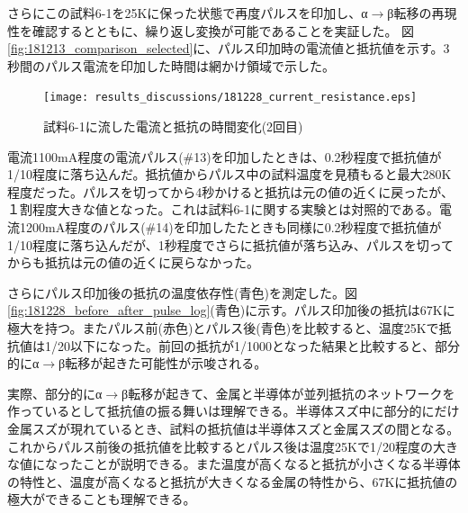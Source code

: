 さらにこの試料6-1を25Kに保った状態で再度パルスを印加し、α$\to$β転移の再現性を確認するとともに、繰り返し変換が可能であることを実証した。
図\ref{fig:181213_comparison_selected}に、パルス印加時の電流値と抵抗値を示す。3秒間のパルス電流を印加した時間は網かけ領域で示した。
\begin{figure}[!h]
    \begin{center}
   \texttt{[image: results\_discussions/181228\_current\_resistance.eps]}
  \end{center}
  \caption{試料6-1に流した電流と抵抗の時間変化(2回目)}
  \label{fig:181228_current_resistance.eps}
\end{figure}

電流1100mA程度の電流パルス(\#13)を印加したときは、0.2秒程度で抵抗値が1/10程度に落ち込んだ。抵抗値からパルス中の試料温度を見積もると最大280K程度だった。パルスを切ってから4秒かけると抵抗は元の値の近くに戻ったが、１割程度大きな値となった。これは試料6-1に関する実験とは対照的である。電流1200mA程度のパルス(\#14)を印加したたときも同様に0.2秒程度で抵抗値が1/10程度に落ち込んだが、1秒程度でさらに抵抗値が落ち込み、パルスを切ってからも抵抗は元の値の近くに戻らなかった。%

さらにパルス印加後の抵抗の温度依存性(青色)を測定した。図\ref{fig:181228_before_after_pulse_log}(青色)に示す。パルス印加後の抵抗は67Kに極大を持つ。またパルス前(赤色)とパルス後(青色)を比較すると、温度25Kで抵抗値は1/20以下になった。前回の抵抗が1/1000となった結果と比較すると、部分的にα$\to$β転移が起きた可能性が示唆される。

実際、部分的にα$\to$β転移が起きて、金属と半導体が並列抵抗のネットワークを作っているとして抵抗値の振る舞いは理解できる。半導体スズ中に部分的にだけ金属スズが現れているとき、試料の抵抗値は半導体スズと金属スズの間となる。これからパルス前後の抵抗値を比較するとパルス後は温度25Kで1/20程度の大きな値になったことが説明できる。また温度が高くなると抵抗が小さくなる半導体の特性と、温度が高くなると抵抗が大きくなる金属の特性から、67Kに抵抗値の極大ができることも理解できる\cite{Mayr,McLachlan}。

